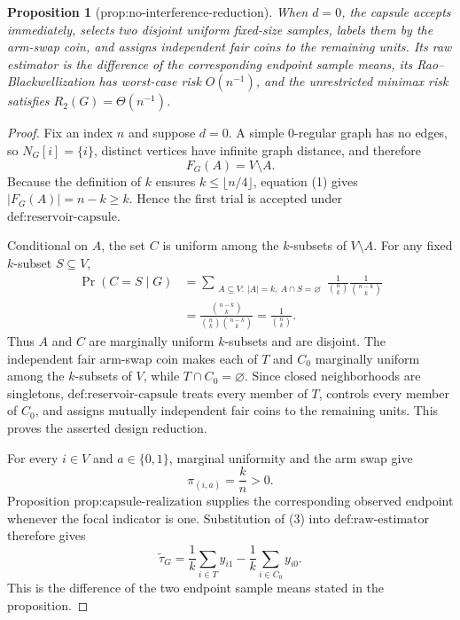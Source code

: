 \documentclass{article}
\newtheorem{proposition}{Proposition}
\begin{document}
\begin{proposition}[prop:no-interference-reduction]\label{prop:no-interference-reduction}
When \(d=0\), the capsule accepts immediately, selects two disjoint uniform fixed-size samples, labels them by the arm-swap coin, and assigns independent fair coins to the remaining units.  Its raw estimator is the difference of the corresponding endpoint sample means, its Rao--Blackwellization has worst-case risk \(O(n^{-1})\), and the unrestricted minimax risk satisfies \(R_2(G)=\Theta(n^{-1})\).
\end{proposition}
\begin{proof}
Fix an index \(n\) and suppose \(d=0\).  A simple \(0\)-regular graph has no edges, so \(N_G[i]=\{i\}\), distinct vertices have infinite graph distance, and therefore
\[
 F_G(A)=V\setminus A. \tag{1}
\]
Because the definition of \(k\) ensures \(k\le\lfloor n/4\rfloor\), equation (1) gives \(|F_G(A)|=n-k\ge k\).  Hence the first trial is accepted under \(\text{def:reservoir-capsule}\).

Conditional on \(A\), the set \(C\) is uniform among the \(k\)-subsets of \(V\setminus A\).  For any fixed \(k\)-subset \(S\subseteq V\),
\[
\begin{aligned}
 \Pr(C=S\mid G)
 &=\sum_{\substack{A\subseteq V:\ |A|=k,\ A\cap S=\varnothing}}
   \frac1{\binom nk}\frac1{\binom{n-k}{k}}\\
 &=\frac{\binom{n-k}{k}}
         {\binom nk\binom{n-k}{k}}
 =\frac1{\binom nk}. \tag{2}
\end{aligned}
\]
Thus \(A\) and \(C\) are marginally uniform \(k\)-subsets and are disjoint.  The independent fair arm-swap coin makes each of \(T\) and \(C_0\) marginally uniform among the \(k\)-subsets of \(V\), while \(T\cap C_0=\varnothing\).  Since closed neighborhoods are singletons, \(\text{def:reservoir-capsule}\) treats every member of \(T\), controls every member of \(C_0\), and assigns mutually independent fair coins to the remaining units.  This proves the asserted design reduction.

For every \(i\in V\) and \(a\in\{0,1\}\), marginal uniformity and the arm swap give
\[
 \pi_{(i,a)}=\frac{k}{n}>0. \tag{3}
\]
Proposition \(\text{prop:capsule-realization}\) supplies the corresponding observed endpoint whenever the focal indicator is one.  Substitution of (3) into \(\text{def:raw-estimator}\) therefore gives
\[
 \widetilde\tau_G
 =\frac1k\sum_{i\in T}y_{i1}
  -\frac1k\sum_{i\in C_0}y_{i0}. \tag{4}
\]
This is the difference of the two endpoint sample means stated in the proposition.


\end{proof}
\end{document}
